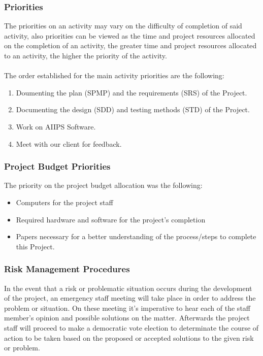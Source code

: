 \documentclass[12pt]{article}
\begin{document}
\subsubsection{Priorities}
The priorities on an activity may vary on the difficulty of completion of said activity, also priorities can be viewed as the time and project resources allocated on the completion of an activity, the greater time and project resources allocated to an activity, the higher the priority of the activity. \\\\
	The order established for the main activity priorities are the following:

\begin{enumerate}
  \item Doumenting the plan (SPMP) and the requirements (SRS) of the Project.
  \item Documenting the design (SDD) and testing methods (STD) of the Project.
  \item Work on AIIPS Software.
  \item Meet with our client for feedback.
\end{enumerate}

\subsubsection{Project Budget Priorities}
The priority on the project budget allocation was the following:
\begin{itemize}
  \item Computers for the project staff
  \item Required hardware and software for the project’s completion
  \item Papers necessary for a better understanding of the process/steps to complete this Project.
\end{itemize}

\subsubsection{Risk Management Procedures}
In the event that a risk or problematic situation occurs during the development of the project, an emergency staff meeting will take place in order to address the problem or situation. On these meeting it’s imperative to hear each of the staff member’s opinion and possible solutions on the matter. Afterwards the project staff will proceed to make a democratic vote election to determinate the course of action to be taken based on the proposed or accepted solutions to the given risk or problem.
\end{document}

